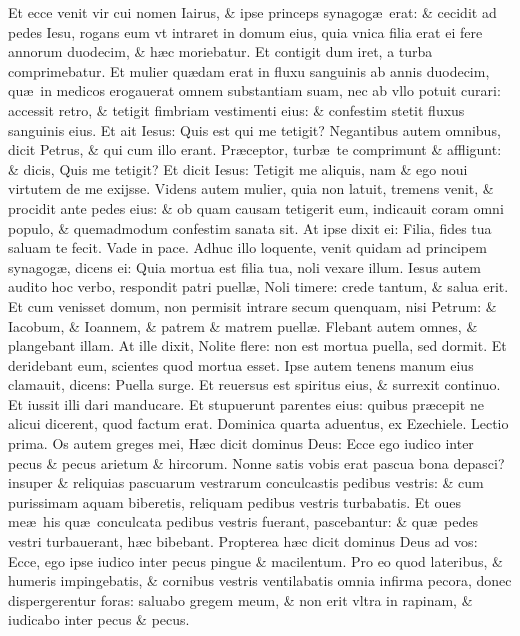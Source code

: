 \documentclass[a5paper,10pt]{book}
\def\rightmarginnote{%
	\lrmarginnote{\hskip\columnwidth \hskip -1em}}
\def\ae{æ}
\begin{document}
\begin{multicols*}{2}
Et ecce venit vir cui nomen Iairus, \& ipse princeps synagog\ae \ erat: \& cecidit ad pedes Iesu, rogans eum vt intraret in domum eius, quia vnica filia erat ei fere annorum duodecim, \& h\ae c moriebatur.
Et contigit dum iret, a turba comprimebatur. Et mulier qu\ae dam erat in fluxu sanguinis ab annis duodecim, qu\ae \ in medicos erogauerat omnem substantiam suam, nec ab vllo potuit curari: accessit retro, \& tetigit fimbriam vestimenti eius: \& confestim stetit fluxus sanguinis eius.
Et ait Iesus: Quis est qui me tetigit? Negantibus autem omnibus, dicit Petrus, \& qui cum illo erant. Pr\ae ceptor, turb\ae \ te comprimunt \& affligunt: \& dicis, Quis me tetigit?
Et dicit Iesus: Tetigit me aliquis, nam \& ego noui virtutem de me exijsse.
Videns autem mulier, quia non latuit, tremens venit, \& procidit ante pedes eius: \& ob quam causam tetigerit eum, indicauit coram omni populo, \& quemadmodum confestim sanata sit.
At ipse dixit ei: Filia, fides tua saluam te fecit. Vade in pace.
Adhuc illo loquente, venit quidam ad principem synagog\ae , dicens ei: Quia mortua est filia tua, noli vexare illum.
Iesus autem audito hoc verbo, respondit patri puell\ae , Noli timere: crede tantum, \& salua erit.
Et cum venisset domum, non permisit intrare secum quenquam, nisi Petrum: \& Iacobum, \& Ioannem, \& patrem \& matrem puell\ae .
Flebant autem omnes, \& plangebant illam. At ille dixit, Nolite flere: non est mortua puella, sed dormit.
Et deridebant eum, scientes quod mortua esset.
Ipse autem tenens manum eius clamauit, dicens: Puella surge.
Et reuersus est spiritus eius, \& surrexit continuo. Et iussit illi dari manducare.
Et stupuerunt parentes eius: quibus pr\ae cepit ne alicui dicerent, quod factum erat.
\newline {} \color{red} \hypertarget{SUN-QVARTA-ADV}{Dominica quarta aduentus,} ex Ezechiele. \hfill Lectio prima. \color{black}
\vspace{-1.25em}
Os\rightmarginnote{c. 34.} autem greges mei, H\ae c dicit dominus Deus: Ecce ego iudico inter pecus \& pecus arietum \& hircorum.
Nonne satis vobis erat pascua bona depasci? insuper \& reliquias pascuarum vestrarum conculcastis pedibus vestris: \& cum purissimam
aquam biberetis, reliquam pedibus vestris turbabatis.
Et oues me\ae \ his qu\ae \ conculcata pedibus vestris fuerant, pascebantur: \& qu\ae \ pedes vestri turbauerant, h\ae c bibebant.
Propterea h\ae c dicit dominus Deus ad vos: Ecce, ego ipse iudico inter pecus pingue \& macilentum.
Pro eo quod lateribus, \& humeris impingebatis, \& cornibus vestris ventilabatis omnia infirma pecora, donec dispergerentur foras: saluabo gregem meum, \& non erit vltra in rapinam, \& iudicabo inter pecus \& pecus.

\end{multicols*}
\end{document}
